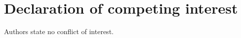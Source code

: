 \documentclass[preprint,12pt]{elsarticle}
\begin{document}


\section*{Declaration of competing interest}
Authors state no conflict of interest.









\clearpage





\clearpage
\end{document}
